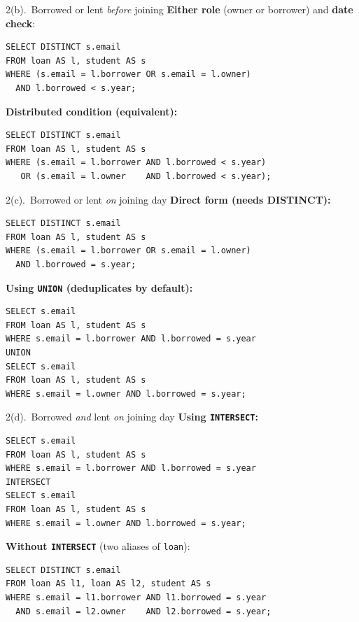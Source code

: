 \documentclass{beamer}
\begin{document}
\begin{frame}[fragile]{2(b).\ Borrowed or lent \emph{before} joining}
\small
\textbf{Either role} (owner or borrower) and \textbf{date check}:
\begin{lstlisting}
SELECT DISTINCT s.email
FROM loan AS l, student AS s
WHERE (s.email = l.borrower OR s.email = l.owner)
  AND l.borrowed < s.year;
\end{lstlisting}
\textbf{Distributed condition (equivalent):}
\begin{lstlisting}
SELECT DISTINCT s.email
FROM loan AS l, student AS s
WHERE (s.email = l.borrower AND l.borrowed < s.year)
   OR (s.email = l.owner    AND l.borrowed < s.year);
\end{lstlisting}
\end{frame}

\begin{frame}[fragile]{2(c).\ Borrowed or lent \emph{on} joining day}
\small
\textbf{Direct form (needs DISTINCT):}
\begin{lstlisting}
SELECT DISTINCT s.email
FROM loan AS l, student AS s
WHERE (s.email = l.borrower OR s.email = l.owner)
  AND l.borrowed = s.year;
\end{lstlisting}
\textbf{Using \texttt{UNION} (deduplicates by default):}
\begin{lstlisting}
SELECT s.email
FROM loan AS l, student AS s
WHERE s.email = l.borrower AND l.borrowed = s.year
UNION
SELECT s.email
FROM loan AS l, student AS s
WHERE s.email = l.owner AND l.borrowed = s.year;
\end{lstlisting}
\end{frame}

\begin{frame}[fragile]{2(d).\ Borrowed \emph{and} lent \emph{on} joining day}
\small
\textbf{Using \texttt{INTERSECT}:}
\begin{lstlisting}
SELECT s.email
FROM loan AS l, student AS s
WHERE s.email = l.borrower AND l.borrowed = s.year
INTERSECT
SELECT s.email
FROM loan AS l, student AS s
WHERE s.email = l.owner AND l.borrowed = s.year;
\end{lstlisting}
\textbf{Without \texttt{INTERSECT}} (two aliases of \texttt{loan}):
\begin{lstlisting}[style=sqlcompact]
SELECT DISTINCT s.email
FROM loan AS l1, loan AS l2, student AS s
WHERE s.email = l1.borrower AND l1.borrowed = s.year
  AND s.email = l2.owner    AND l2.borrowed = s.year;
\end{lstlisting}
\end{frame}
\end{document}
